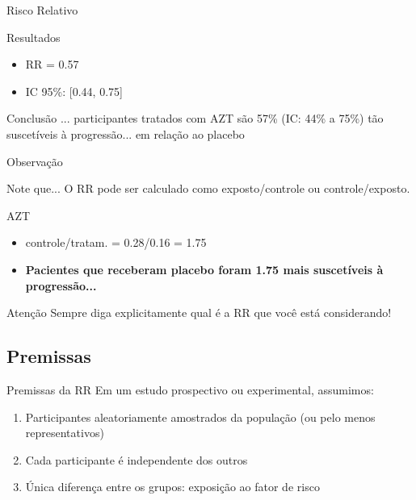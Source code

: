 \documentclass{beamer}
\begin{document}
\begin{frame}{\scriptsize Risco Relativo}
  \begin{exampleblock}{Resultados}
    \begin{itemize}
      \footnotesize
    \item RR = 0.57
    \item IC 95\%: [0.44, 0.75]
    \end{itemize}
  \end{exampleblock}

  \bigskip
  \begin{exampleblock}{Conclusão}
    ... participantes tratados com AZT são 57\% (IC: 44\% a 75\%) tão suscetíveis à progressão... em relação ao placebo
  \end{exampleblock}
\end{frame}

\begin{frame}{\scriptsize Observação}
  \begin{block}{Note que...}
    \footnotesize
    O RR pode ser calculado como exposto/controle ou controle/exposto.
  \end{block}
  \begin{exampleblock}{AZT}
    \begin{itemize}
    \item controle/tratam. = 0.28/0.16 = 1.75
    \item {\bf Pacientes que receberam placebo foram 1.75 mais suscetíveis à progressão...}
    \end{itemize}
  \end{exampleblock}
  \begin{block}{Atenção}
    \footnotesize
    Sempre diga explicitamente qual é a RR que você está considerando!
  \end{block}
\end{frame}

\subsection{Premissas}

\begin{frame}{\scriptsize Premissas da RR}
  Em um estudo prospectivo ou experimental, assumimos:
  \begin{enumerate}
  \item Participantes aleatoriamente amostrados da população (ou pelo menos representativos)
  \item Cada participante é independente dos outros
  \item Única diferença entre os grupos: exposição ao fator de risco
  \end{enumerate}
\end{frame}
\end{document}
